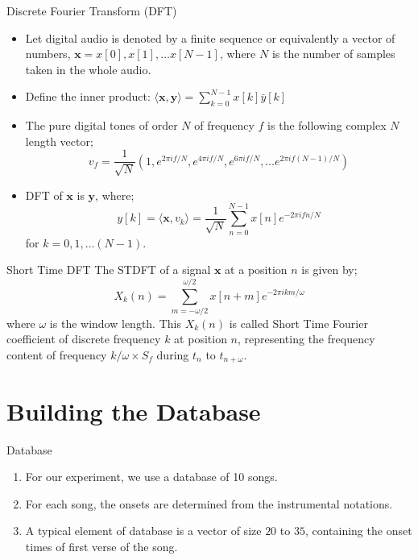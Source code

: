 \documentclass[10pt]{beamer}
\begin{document}
\begin{frame}{Discrete Fourier Transform (DFT)}
    \begin{itemize}
        \item Let digital audio is denoted by a finite sequence or equivalently a vector of numbers, $\textbf{x} = x[0], x[1], \dots x[N-1]$, where $N$ is the number of samples taken in the whole audio.
        \item Define the inner product: $\langle \textbf{x},\textbf{y} \rangle = \sum_{k=0}^{N-1} x[k]\bar{y}[k]$
        \item The pure digital tones of order $N$ of frequency $f$ is the following complex $N$ length vector;
        $$v_{f} = \dfrac{1}{\sqrt{N}}\left(1, e^{2\pi i f/N}, e^{4\pi i f/N}, e^{6\pi i f/N}, \dots e^{2\pi i f(N-1)/N}\right)$$
        \item DFT of $\textbf{x}$ is $\textbf{y}$, where;
        $$y[k] = \langle \textbf{x}, v_k \rangle = \dfrac{1}{\sqrt{N}}\sum_{n=0}^{N-1} x[n] e^{-2\pi i fn/N}$$
        for $k = 0, 1, \dots (N-1)$.
    \end{itemize}
\end{frame}

\begin{frame}{Short Time DFT}
    The STDFT of a signal $\textbf{x}$ at a position $n$ is given by;
    $$X_k(n) = \sum_{m= -\omega/2}^{\omega/2}x[n+m]e^{-2\pi i km/\omega}$$
    where $\omega$ is the window length. This $X_k(n)$ is called Short Time Fourier coefficient of discrete frequency $k$ at position $n$, representing the frequency content of frequency $k/\omega\times S_f$ during $t_n$ to $t_{n+\omega}$.
\end{frame}

\section{Building the Database}
\begin{frame}{Database}
    \begin{enumerate}
        \item For our experiment, we use a database of 10 songs.
        \item For each song, the onsets are determined from the instrumental notations.
        \item A typical element of database is a vector of size $20$ to $35$, containing the onset times of first verse of the song.
    \end{enumerate}
\end{frame}
\end{document}
